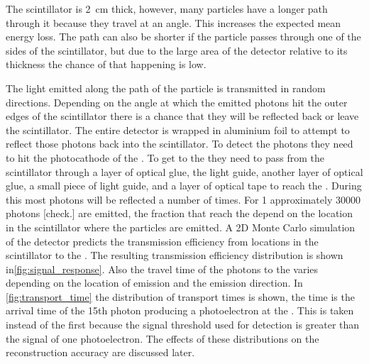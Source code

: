 The scintillator is \SI{2}{\centi\meter} thick, however, many particles have a longer path through it because they travel at an angle. This increases the expected mean energy loss. The path can also be shorter if the particle passes through one of the sides of the scintillator, but due to the large area of the detector relative to its thickness the chance of that happening is low.

The light emitted along the path of the particle is transmitted in random directions. Depending on the angle at which the emitted photons hit the outer edges of the scintillator there is a chance that they will be reflected back or leave the scintillator. The entire detector is wrapped in aluminium foil to attempt to reflect those photons back into the scintillator. To detect the photons they need to hit the photocathode of the \pmt. To get to the \pmt they need to pass from the scintillator through a layer of optical glue, the light guide, another layer of optical glue, a small piece of light guide, and a layer of optical tape to reach the \pmt. During this most photons will be reflected a number of times. For \SI{1}{\mip} approximately 30000 photons [check.] are emitted, the fraction that reach the \pmt depend on the location in the scintillator where the particles are emitted. A 2D Monte Carlo simulation of the detector predicts the transmission efficiency from locations in the scintillator to the \pmt \cite{steijger2010mc}. The resulting transmission efficiency distribution is shown in\cref{fig:signal_response}. Also the travel time of the photons to the \pmt varies depending on the location of emission and the emission direction. In \cref{fig:transport_time} the distribution of transport times is shown, the time is the arrival time of the 15th photon producing a photoelectron at the \pmt. This is taken instead of the first because the signal threshold used for detection is greater than the signal of one photoelectron. The effects of these distributions on the reconstruction accuracy are discussed later.

